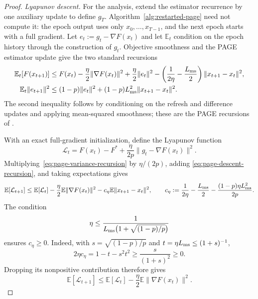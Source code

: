 \documentclass{article}
\newcommand{\E}{\mathbb{E}}
\theoremstyle{definition}
\begin{document}
\begin{proof}
\emph{Lyapunov descent.}
For the analysis, extend the estimator recurrence by one auxiliary update to
define $g_T$.  Algorithm~\ref{alg:restarted-page} need not compute it: the epoch
output uses only $x_0,\ldots,x_{T-1}$, and the next epoch starts with a full
gradient.
Let $e_t:=g_t-\nabla F(x_t)$ and let $\E_t$ condition on the epoch history
through the construction of $g_t$.  Objective smoothness and the PAGE estimator
update give the two standard recursions
\begin{align}
 \E_t[F(x_{t+1})]
 &\le F(x_t)-\frac\eta2\|\nabla F(x_t)\|^2
 +\frac\eta2\|e_t\|^2
 -\left(\frac1{2\eta}-\frac{L_{\rm ms}}2\right)
  \|x_{t+1}-x_t\|^2,
 \label{eq:page-descent-recursion}\\
 \E_t\|e_{t+1}\|^2
 &\le(1-p)\|e_t\|^2
 +(1-p)L_{\rm ms}^2\|x_{t+1}-x_t\|^2.
 \label{eq:page-variance-recursion}
\end{align}
The second inequality follows by conditioning on the refresh and difference
updates and applying mean-squared smoothness; these are the PAGE recursions of
\citet[proof of Theorem~1]{li2021page}.

With an exact full-gradient initialization, define the Lyapunov function
\begin{equation}
 \mathcal L_t=F(x_t)-F^*
 +\frac{\eta}{2p}\|g_t-\nabla F(x_t)\|^2.
\end{equation}
Multiplying~\eqref{eq:page-variance-recursion} by $\eta/(2p)$, adding
\eqref{eq:page-descent-recursion}, and taking expectations gives
\begin{equation*}
 \E[\mathcal L_{t+1}]
 \le\E[\mathcal L_t]-\frac\eta2\E\|\nabla F(x_t)\|^2
 -c_\eta\E\|x_{t+1}-x_t\|^2,
 \qquad
 c_\eta:=\frac1{2\eta}-\frac{L_{\rm ms}}2
 -\frac{(1-p)\eta L_{\rm ms}^2}{2p}.
\end{equation*}
The condition
\begin{equation}
 \eta\le
 \frac1{L_{\rm ms}\bigl(1+\sqrt{(1-p)/p}\bigr)}
 \label{eq:page-stability-condition}
\end{equation}
ensures $c_\eta\ge0$.  Indeed, with
$s=\sqrt{(1-p)/p}$ and $t=\eta L_{\rm ms}\le(1+s)^{-1}$,
\begin{equation*}
 2\eta c_\eta=1-t-s^2t^2
 \ge\frac{s}{(1+s)^2}\ge0.
\end{equation*}
Dropping its nonpositive contribution therefore gives
\begin{equation}
 \E[\mathcal L_{t+1}]
 \le\E[\mathcal L_t]-\frac\eta2\E\|\nabla F(x_t)\|^2.
\label{eq:page-lyapunov-step}
\end{equation}


\end{proof}
\end{document}
